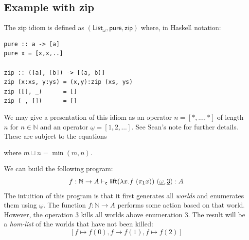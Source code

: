 \documentclass{article}
\theoremstyle{definition}
\theoremstyle{remark}
\newcommand{\mult}{\phi}
\begin{document}
\subsection{Example with zip}

\newcommand{\List}{\mathsf{List}_\omega}
\newcommand{\pure}{\mathsf{pure}}
\newcommand{\zip}{\mathsf{zip}}

The zip idiom is defined as $(\List, \pure, \zip)$ where, in Haskell notation:
\begin{lstlisting}
pure :: a -> [a]
pure x = [x,x,..]

zip :: ([a], [b]) -> [(a, b)]
zip (x:xs, y:ys) = (x,y):zip (xs, ys)
zip ([], _)      = []
zip (_, [])      = []
\end{lstlisting}
We may give a presentation of this idiom as an operator $\underline{n} = [*,\dots, *]$ of length $n$ for $n\in \mathbb{N}$ and an operator $\underline{\omega} = [1,2,\dots]$.
See Sean's note for further details.
These are subject to the equations
where $m \sqcup n = \min(m,n)$.

We can build the following program:
\[
  f:\mathbb{N} \to A \vdash_{\mathsf{c}} {\mathsf{lift}(\lambda x. {f \ (\pi_1x)}) \ (\underline{\omega}, \underline{3})}:A
\]
The intuition of this program is that it first generates all \emph{worlds} and enumerates them using $\underline{\omega}$.
The function $f:\mathbb{N}\to A$ performs some action based on that world. However, the operation $\underline{3}$ kills all worlds above enumeration $3$.
The result will be a \emph{hom-list} of the worlds that have not been killed:
\[
  [f \mapsto f(0), f\mapsto f(1), f \mapsto f(2)]
\]



\end{document}

